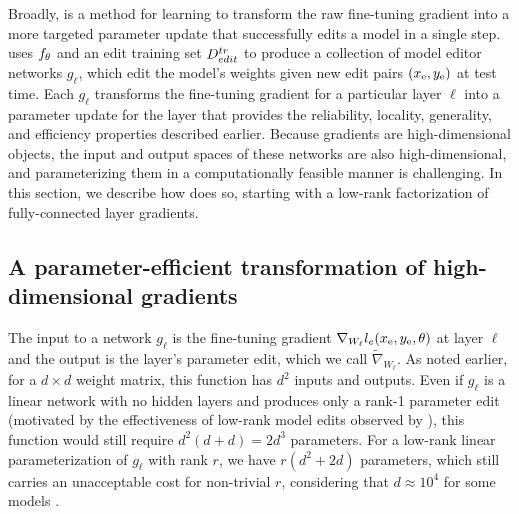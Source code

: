 \documentclass{article}
\begin{document}
\section{\fullname}
\label{sec:method}
Broadly, {\name} is a method for learning to transform the raw fine-tuning gradient into a more targeted parameter update that successfully edits a model in a single step. {\name} uses $f_\theta$ and an edit training set $D^{tr}_{edit}$ to produce a collection of model editor networks $g_\ell$, which edit the model's weights given new edit pairs $(x_\text{e}, y_\text{e})$ at test time. Each $g_\ell$ transforms the fine-tuning gradient for a particular layer $\ell$ into a parameter update for the layer that provides the reliability, locality, generality, and efficiency properties described earlier. Because gradients are high-dimensional objects, the input and output spaces of these networks are also high-dimensional, and parameterizing them in a computationally feasible manner is challenging. In this section, we describe how {\name} does so, starting with a low-rank factorization of fully-connected layer gradients.

\subsection{A parameter-efficient transformation of high-dimensional gradients}



The input to a {\name} network $g_\ell$ is the fine-tuning gradient $\nabla_{W_\ell}l_e(x_\text{e},y_\text{e},\theta)$ at layer $\ell$ and the output is the layer's parameter edit, which we call $\tilde\nabla_{W_\ell}$. As noted earlier, for a $d \times d$ weight matrix, this function has $d^2$ inputs and outputs. Even if $g_\ell$ is a linear network with no hidden layers and produces only a rank-1 parameter edit (motivated by the effectiveness of low-rank model edits observed by \citet{hu2021lora}), this function would still require $d^2(d+d) = 2d^3$ parameters. For a low-rank linear parameterization of $g_\ell$ with rank $r$, we have $r(d^2 + 2d)$ parameters, which still carries an unacceptable cost for non-trivial $r$, considering that $d\approx 10^4$ for some models \citep{2020t5}.
\end{document}
